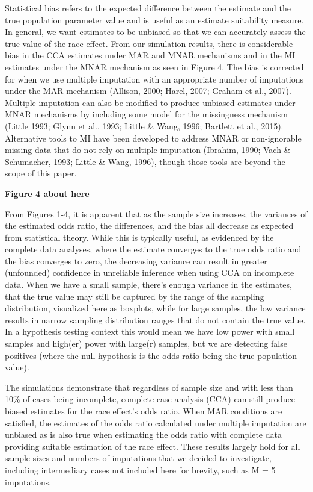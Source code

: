 \documentclass[titlepage]{article}
\begin{document}
Statistical bias refers to the expected difference between the estimate and the true population parameter value and is useful as an estimate suitability measure. In general, we want estimates to be unbiased so that we can accurately assess the true value of the race effect. From our simulation results, there is considerable bias in the CCA estimates under MAR and MNAR mechanisms and in the MI estimates under the MNAR mechanism as seen in Figure 4. The bias is corrected for when we use multiple imputation with an appropriate number of imputations under the MAR mechanism (Allison, 2000; Harel, 2007; Graham et al., 2007). Multiple imputation can also be modified to produce unbiased estimates under MNAR mechanisms by including some model for the missingness mechanism (Little 1993; Glynn et al., 1993; Little \& Wang, 1996; Bartlett et al., 2015). Alternative tools to MI have been developed to address MNAR or non-ignorable missing data that do not rely on multiple imputation (Ibrahim, 1990; Vach \& Schumacher, 1993; Little \& Wang, 1996), though those tools are beyond the scope of this paper.

\begin{center}
    \textbf{Figure 4 about here}
\end{center}

From Figures 1-4, it is apparent that as the sample size increases, the variances of the estimated odds ratio, the differences, and the bias all decrease as expected from statistical theory. While this is typically useful, as evidenced by the complete data analyses, where the estimate converges to the true odds ratio and the bias converges to zero, the decreasing variance can result in greater (unfounded) confidence in unreliable inference when using CCA on incomplete data. When we have a small sample, there’s enough variance in the estimates, that the true value may still be captured by the range of the sampling distribution, visualized here as boxplots, while for large samples, the low variance results in narrow sampling distribution ranges that do not contain the true value. In a hypothesis testing context this would mean we have low power with small samples and high(er) power with large(r) samples, but we are detecting false positives (where the null hypothesis is the odds ratio being the true population value). 

The simulations demonstrate that regardless of sample size and with less than 10\% of cases being incomplete, complete case analysis (CCA) can still produce biased estimates for the race effect’s odds ratio. When MAR conditions are satisfied, the estimates of the odds ratio calculated under multiple imputation are unbiased as is also true when estimating the odds ratio with complete data providing suitable estimation of the race effect. These results largely hold for all sample sizes and numbers of imputations that we decided to investigate, including intermediary cases not included here for brevity, such as M = 5 imputations.
\end{document}
